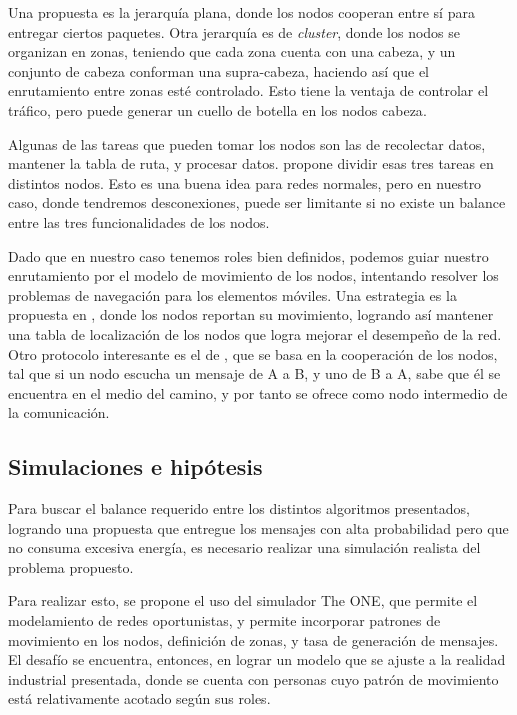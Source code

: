 \documentclass[10pt,preprint,onecolumn]{paper}
\begin{document}
Una propuesta es la jerarquía plana, donde los nodos cooperan entre sí para entregar ciertos paquetes. Otra jerarquía es de \emph{cluster}, donde los nodos se organizan en zonas, teniendo que cada zona cuenta con una cabeza, y un conjunto de cabeza conforman una supra-cabeza, haciendo así que el enrutamiento entre zonas esté controlado. Esto tiene la ventaja de controlar el tráfico, pero puede generar un cuello de botella en los nodos cabeza\cite{62}.

Algunas de las tareas que pueden tomar los nodos son las de recolectar datos, mantener la tabla de ruta, y procesar datos. \cite{130} propone dividir esas tres tareas en distintos nodos. Esto es una buena idea para redes normales, pero en nuestro caso, donde tendremos desconexiones, puede ser limitante si no existe un balance entre las tres funcionalidades de los nodos.

Dado que en nuestro caso tenemos roles bien definidos, podemos guiar nuestro enrutamiento por el modelo de movimiento de los nodos, intentando resolver los problemas de navegación para los elementos móviles. Una estrategia es la propuesta en \cite{110}, donde los nodos reportan su movimiento, logrando así mantener una tabla de localización de los nodos que logra mejorar el desempeño de la red. Otro protocolo interesante es el de \cite{117}, que se basa en la cooperación de los nodos, tal que si un nodo escucha un mensaje de A a B, y uno de B a A, sabe que él se encuentra en el medio del camino, y por tanto se ofrece como nodo intermedio de la comunicación.

\subsection{Simulaciones e hipótesis}
\label{sec:sim}

Para buscar el balance requerido entre los distintos algoritmos presentados, logrando una propuesta que entregue los mensajes con alta probabilidad pero que no consuma excesiva energía, es necesario realizar una simulación realista del problema propuesto.

Para realizar esto, se propone el uso del simulador The ONE\cite{theone}, que permite el modelamiento de redes oportunistas, y permite incorporar patrones de movimiento en los nodos, definición de zonas, y tasa de generación de mensajes. El desafío se encuentra, entonces, en lograr un modelo que se ajuste a la realidad industrial presentada, donde se cuenta con personas cuyo patrón de movimiento está relativamente acotado según sus roles.
\end{document}
